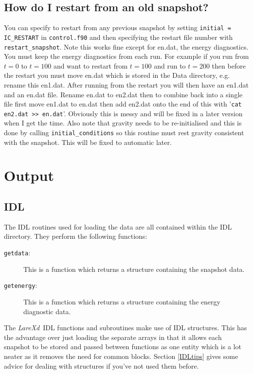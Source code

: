 \documentclass[11pt]{article}
\newcommand{\lare}{{\it LareXd}\ }
\begin{document}
\subsection*{How do I restart from an old snapshot?}
You can specify to restart from any previous snapshot by setting \texttt{initial = IC\_RESTART} in
\texttt{control.f90} and then specifying the restart file number with \texttt{restart\_snapshot}. Note this works fine except for en.dat, the energy diagnostics. You must keep the energy diagnostics from each run. For example if you run from $t=0$ to $t=100$ and want to restart from $t=100$ and run to $t=200$ then before the restart you must move en.dat which is stored in the Data directory, e.g. rename this en1.dat. After running from the restart you will then have an en1.dat and an en.dat file. Rename en.dat to en2.dat then to combine back into a single file first move en1.dat to en.dat then add en2.dat onto the end of this with '\texttt{cat en2.dat >> en.dat}'. Obviously this is messy and will be fixed in a later version when I get the time. Also note that gravity needs to be re-initialised and this is done by calling {\tt initial\_conditions} so this routine must rest gravity consistent with the snapshot. This will be fixed to automatic later.           


\section{Output}
\subsection{IDL}
The IDL routines used for loading the data are all contained within the IDL directory. They perform the following functions:
\begin{description}
\item[\texttt{getdata}:] This is a function which returns a structure containing the snapshot data.
\item[\texttt{getenergy}:]  This is a function which returns a structure containing the energy diagnostic data.
\end{description}

The \lare IDL functions and subroutines make use of IDL structures. This has the advantage over just loading the separate arrays in that it allows each snapshot to be stored and passed between functions as one entity which is a lot neater as it removes the need for common blocks. Section \ref{IDLtips} gives some advice for dealing with structures if you've not used them before.
\end{document}
